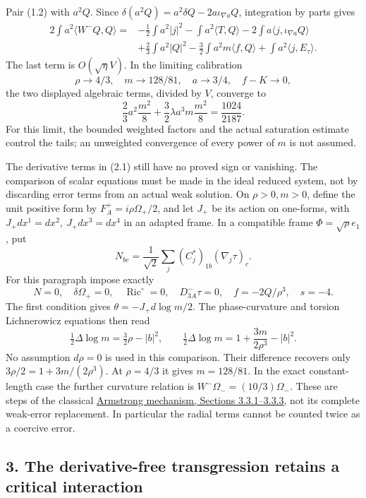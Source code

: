 \documentclass[
  10pt,
]{article}
\begin{document}
Pair (1.2) with \(a^2Q\). Since
\(\delta(a^2Q)=a^2\delta Q-2a\iota_{\nabla a}Q\), integration by parts
gives \[
\begin{aligned}
 2\int a^2\langle W^-Q,Q\rangle={}&
 -\tfrac12\int a^2|j|^2-\int a^2\langle T,Q\rangle
 -2\int a\langle j,\iota_{\nabla a}Q\rangle\\
 &+\tfrac23\int a^2|Q|^2-\tfrac32\int a^2m\langle f,Q\rangle
 +\int a^2\langle j,E_\tau\rangle .
\end{aligned}                                         \tag{2.1}
\] The last term is \(O(\sqrt\eta V)\). In the limiting calibration \[
 \rho\to4/3,\quad m\to128/81,\quad a\to3/4,\quad f-K\to0,
\] the two displayed algebraic terms, divided by \(V\), converge to \[
 \frac23a^2\frac{m^2}{8}
       +\frac32\lambda a^3m\frac{m^2}{8}
       =\frac{1024}{2187}.                            \tag{2.2}
\] For this limit, the bounded weighted factors and the actual
saturation estimate control the tails; an unweighted convergence of
every power of \(m\) is not assumed.

The derivative terms in (2.1) still have no proved sign or vanishing.
The comparison of scalar equations must be made in the ideal reduced
system, not by discarding error terms from an actual weak solution. On
\(\rho>0,m>0\), define the unit positive form by
\(F_A^+=i\rho\Omega_+/2\), and let \(J_+\) be its action on one-forms,
with \(J_+dx^1=dx^2,\ J_+dx^3=dx^4\) in an adapted frame. In a
compatible frame \(\Phi=\sqrt\rho e_1\), put \[
 N_{bc}=\frac1{\sqrt2}\sum_j(C_j^*)_{1b}(\nabla_j\tau)_c .
\] For this paragraph impose exactly \[
 N=0,\quad \delta\Omega_+=0,\quad
 \operatorname{Ric}^{\circ}=0,\quad D^-_{3A}\tau=0,\quad
 f=-2Q/\rho^3,\quad s=-4.
\] The first condition gives \(\theta=-J_+d\log m/2\). The
phase-curvature and torsion Lichnerowicz equations then read \[
 \tfrac12\Delta\log m=\tfrac32\rho-|b|^2,\qquad
 \tfrac12\Delta\log m=1+\frac{3m}{2\rho^3}-|b|^2 .
\] No assumption \(d\rho=0\) is used in this comparison. Their
difference recovers only \(3\rho/2=1+3m/(2\rho^3)\). At \(\rho=4/3\) it
gives \(m=128/81\). In the exact constant-length case the further
curvature relation is \(W^-\Omega_-=(10/3)\Omega_-\). These are steps of
the classical
\href{https://johnarmstrongmaths.com/publications/resources/thesis.pdf}{Armstrong
mechanism, Sections 3.3.1--3.3.3}, not its complete weak-error
replacement. In particular the radial terms cannot be counted twice as a
coercive error.

\hypertarget{the-derivative-free-transgression-retains-a-critical-interaction}{%
\subsection{3. The derivative-free transgression retains a critical
interaction}\label{the-derivative-free-transgression-retains-a-critical-interaction}}
\end{document}
